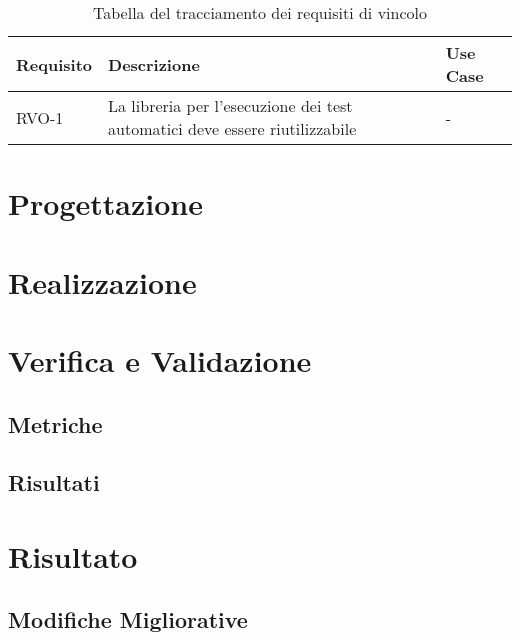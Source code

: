 	\begin{table}%
		\caption{Tabella del tracciamento dei requisiti di vincolo}
		\label{tab:requisiti-vincolo}
		\begin{tabularx}{\textwidth}{lXl}
			\hline\hline
			\textbf{Requisito} & \textbf{Descrizione} & \textbf{Use Case}\\
			\hline
			RVO-1    & La libreria per l'esecuzione dei test automatici deve essere riutilizzabile & - \\
			\hline
		\end{tabularx}
	\end{table}%

\section{Progettazione}

\section{Realizzazione}

\section{Verifica e Validazione}
	\subsection{Metriche}
	
	\subsection{Risultati}

\section{Risultato}
	\subsection{Modifiche Migliorative}
